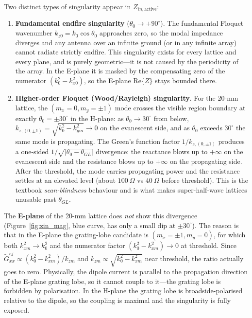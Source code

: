 \documentclass{article}
\begin{document}
Two distinct types of singularity appear in $Z_{in,\text{active}}$:

\begin{enumerate}
\item \textbf{Fundamental endfire singularity} ($\theta_0 \to \pm 90^\circ$). The fundamental Floquet wavenumber $k_{z0} = k_0\cos\theta_0$ approaches zero, so the modal impedance diverges and any antenna over an infinite ground (or in any infinite array) cannot radiate strictly endfire. This singularity exists for every lattice and every plane, and is purely geometric---it is not caused by the periodicity of the array. In the E-plane it is masked by the compensating zero of the numerator $(k_0^2 - k_{x0}^2)$, so the E-plane Re$\{Z\}$ stays bounded there.

\item \textbf{Higher-order Floquet (Wood/Rayleigh) singularity}. For the 20-mm lattice, the $(m_x=0, m_y=\pm 1)$ mode crosses the visible region boundary at exactly $\theta_0 = \pm 30^\circ$ in the H-plane: as $\theta_0 \to 30^\circ$ from below, $k_{z,(0,\pm 1)} = \sqrt{k_0^2 - k_{ym}^2} \to 0$ on the evanescent side, and as $\theta_0$ exceeds $30^\circ$ the same mode is propagating. The Green's function factor $1/k_{z,(0,\pm 1)}$ produces a one-sided $1/\sqrt{|\theta_0 - \theta_{GL}|}$ divergence: the reactance blows up to $+\infty$ on the evanescent side and the resistance blows up to $+\infty$ on the propagating side. After the threshold, the mode carries propagating power and the resistance settles at an elevated level (about $\SI{100}{\Omega}$ vs $\SI{40}{\Omega}$ before threshold). This is the textbook \emph{scan-blindness} behaviour and is what makes super-half-wave lattices unusable past $\theta_{GL}$.
\end{enumerate}

The \textbf{E-plane} of the 20-mm lattice does \emph{not} show this divergence (Figure~\ref{fig:zin_mag}, blue curve, has only a small dip at $\pm 30^\circ$). The reason is that in the E-plane the grating-lobe candidate is $(m_x=\pm 1, m_y=0)$, for which both $k_{xm}^2 \to k_0^2$ and the numerator factor $(k_0^2 - k_{xm}^2) \to 0$ at threshold. Since $\widetilde{G}_{xx}^{ej} \propto (k_0^2 - k_{xm}^2)/k_{zm}$ and $k_{zm} \propto \sqrt{k_0^2 - k_{xm}^2}$ near threshold, the ratio actually goes to zero. Physically, the dipole current is parallel to the propagation direction of the E-plane grating lobe, so it cannot couple to it---the grating lobe is forbidden by polarisation. In the H-plane the grating lobe is broadside-polarised relative to the dipole, so the coupling is maximal and the singularity is fully exposed.
\end{document}
